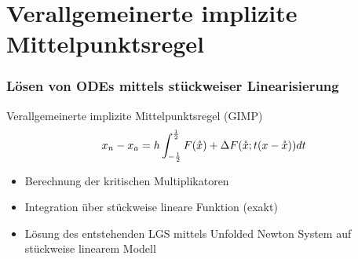 \section[GIMP]{Verallgemeinerte implizite Mittelpunktsregel}
\begin{frame}[<+->]
\frametitle{Lösen von ODEs mittels stückweiser Linearisierung}
 \begin{block}{Verallgemeinerte implizite Mittelpunktsregel (GIMP)}
 \[
  x_n - x_a = h\int_{-\frac{1}{2}}^{\frac{1}{2}} F(\mathring{x}) + \Delta F(\mathring{x}; t(x-\mathring{x}))dt
 \]
\end{block}
\begin{itemize}
 \item Berechnung der kritischen Multiplikatoren
 \item Integration über stückweise lineare Funktion (exakt)
 \item Lösung des entstehenden LGS mittels Unfolded Newton System auf stückweise linearem Modell
\end{itemize}

\end{frame}

